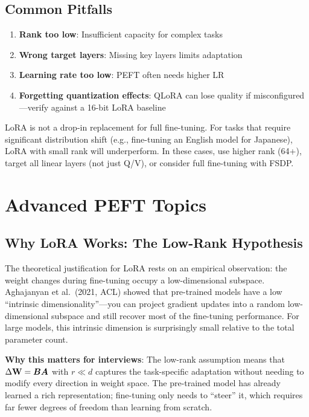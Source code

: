 \subsection{Common Pitfalls}

\begin{enumerate}
    \item \textbf{Rank too low}: Insufficient capacity for complex tasks
    \item \textbf{Wrong target layers}: Missing key layers limits adaptation
    \item \textbf{Learning rate too low}: PEFT often needs higher LR
    \item \textbf{Forgetting quantization effects}: QLoRA can lose quality if misconfigured---verify against a 16-bit LoRA baseline
\end{enumerate}

\begin{warningbox}
LoRA is not a drop-in replacement for full fine-tuning. For tasks that require significant distribution shift (e.g., fine-tuning an English model for Japanese), LoRA with small rank will underperform. In these cases, use higher rank (64+), target all linear layers (not just Q/V), or consider full fine-tuning with FSDP.
\end{warningbox}

\section{Advanced PEFT Topics}
\label{sec:peft_advanced}

\subsection{Why LoRA Works: The Low-Rank Hypothesis}

The theoretical justification for LoRA rests on an empirical observation: the weight changes during fine-tuning occupy a low-dimensional subspace. Aghajanyan et al.\ (2021, ACL) showed that pre-trained models have a low ``intrinsic dimensionality''---you can project gradient updates into a random low-dimensional subspace and still recover most of the fine-tuning performance. For large models, this intrinsic dimension is surprisingly small relative to the total parameter count.

\textbf{Why this matters for interviews}: The low-rank assumption means that $\Delta \mathbf{W} = \bm{B} \bm{A}$ with $r \ll d$ captures the task-specific adaptation without needing to modify every direction in weight space. The pre-trained model has already learned a rich representation; fine-tuning only needs to ``steer'' it, which requires far fewer degrees of freedom than learning from scratch.


